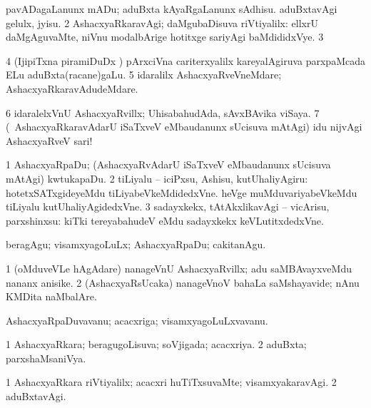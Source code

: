 {{{{{{\noindent
\gl{\pagu}
\expl{}
\bmng
\bnum
{}  
\banum
{} pavADagaLanunx mADu; aduBxta kAyaRgaLanunx sAdhisu. 
 aduBxtavAgi gelulx, jyisu. 
\eanum
\numie
\num{2}  AshacxyaRkaravAgi; daMgubaDisuva riVtiyalilx:  ellxrU daMgAguvaMte, niVnu modalbArige hotitxge sariyAgi baMdididxVye. 
\num{3}  
\num{4}  (IjipiTxna piramiDuDx \mo) pArxciVna cariterxyalilx kareyalAgiruva parxpaMcada ELu aduBxta(racane)gaLu. 
\num{5}  idaralilx AshacxyaRveVneMdare; AshacxyaRkaravAdudeMdare. 
\num{6}  idaralelxVnU AshacxyaRvillx; UhisabahudAda, sAvxBAvika viSaya. 
\num{7}  (\sA\ AshacxyaRkaravAdarU iSaTxveV eMbaudanunx sUcisuva mAtAgi) idu nijvAgi AshacxyaRveV sari! 
\enum
\emng
\eentry

\bentry
{} 
\gl{\sakirx}
\expl{}
\bmng
\bnum
\num{1} AshacxyaRpaDu; (AshacxyaRvAdarU iSaTxveV eMbaudanunx sUcisuva mAtAgi) kwtukapaDu. 
\num{2} tiLiyalu -- iciPxsu, Ashisu, kutUhaliyAgiru:  hotetxSATxgideyeMdu tiLiyabeVkeMdidedxVne.  heVge muMduvariyabeVkeMdu tiLiyalu kutUhaliyAgidedxVne. 
\num{3} sadayxkekx, tAtAkxlikavAgi -- vicArisu, parxshinxsu:  kiTki tereyabahudeV eMdu sadayxkekx keVLutitxdedxVne. 
\enum
\emng

\noindent 
\gl{\akirx}
\expl{}
\bmng
beragAgu; visamxyagoLuLx; AshacxyaRpaDu; cakitanAgu. 
\emng

\noindent
\gl{\pagu}
\expl{}
\bmng
\bnum
\num{1}  (oMduveVLe hAgAdare) nanageVnU AshacxyaRvillx; adu saMBAvayxveMdu nananx anisike. 
\num{2}  (AshacxyaRsUcaka) nanageVnoV bahaLa saMshayavide; nAnu KMDita naMbalAre. 
\enum
\emng
\eentry

\bentry
{} 
\gl{\nA}
\expl{}
\bmng
AshacxyaRpaDuvavanu; acacxriga; visamxyagoLuLxvavanu. 
\emng
\eentry

\bentry
{} 
\gl{\gu}
\expl{}
\bmng
\bnum
\num{1} AshacxyaRkara; beragugoLisuva; soVjigada; acacxriya. 
\num{2} aduBxta; parxshaMsaniVya. 
\enum
\emng
\eentry

\bentry
{} 
\gl{\kirxvi}
\expl{}
\bmng
\bnum
\num{1} AshacxyaRkara riVtiyalilx; acacxri huTiTxsuvaMte; visamxyakaravAgi. 
\num{2} aduBxtavAgi. 
\enum
\emng
\eentry

}}}}}}
